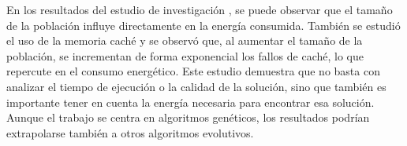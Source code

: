 En los resultados del estudio de investigación \cite{diaz2022population}, se puede observar que el tamaño de la población influye directamente en la energía consumida. También se estudió el uso de la memoria caché y se observó que, al aumentar el tamaño de la población, se incrementan de forma exponencial los fallos de caché, lo que repercute en el consumo energético. Este estudio demuestra que no basta con analizar el tiempo de ejecución o la calidad de la solución, sino que también es importante tener en cuenta la energía necesaria para encontrar esa solución. Aunque el trabajo se centra en algoritmos genéticos, los resultados podrían extrapolarse también a otros algoritmos evolutivos.

  


